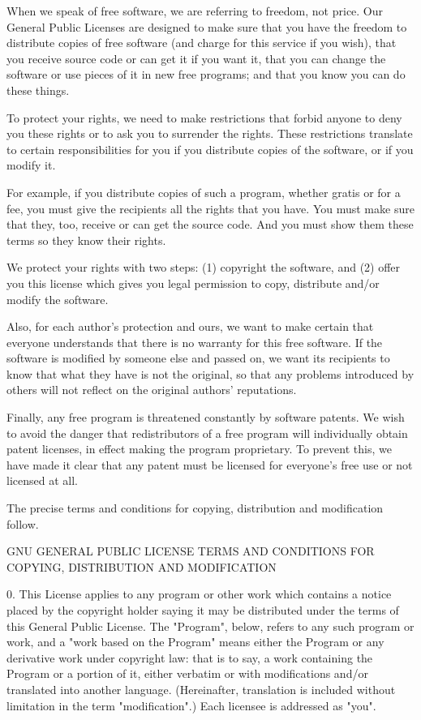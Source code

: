 \documentclass{doc}
\begin{document}
  When we speak of free software, we are referring to freedom, not
price.  Our General Public Licenses are designed to make sure that you
have the freedom to distribute copies of free software (and charge for
this service if you wish), that you receive source code or can get it
if you want it, that you can change the software or use pieces of it
in new free programs; and that you know you can do these things.

  To protect your rights, we need to make restrictions that forbid
anyone to deny you these rights or to ask you to surrender the rights.
These restrictions translate to certain responsibilities for you if you
distribute copies of the software, or if you modify it.

  For example, if you distribute copies of such a program, whether
gratis or for a fee, you must give the recipients all the rights that
you have.  You must make sure that they, too, receive or can get the
source code.  And you must show them these terms so they know their
rights.

  We protect your rights with two steps: (1) copyright the software, and
(2) offer you this license which gives you legal permission to copy,
distribute and/or modify the software.

  Also, for each author's protection and ours, we want to make certain
that everyone understands that there is no warranty for this free
software.  If the software is modified by someone else and passed on, we
want its recipients to know that what they have is not the original, so
that any problems introduced by others will not reflect on the original
authors' reputations.

  Finally, any free program is threatened constantly by software
patents.  We wish to avoid the danger that redistributors of a free
program will individually obtain patent licenses, in effect making the
program proprietary.  To prevent this, we have made it clear that any
patent must be licensed for everyone's free use or not licensed at all.

  The precise terms and conditions for copying, distribution and
modification follow.

		    GNU GENERAL PUBLIC LICENSE
   TERMS AND CONDITIONS FOR COPYING, DISTRIBUTION AND MODIFICATION

  0. This License applies to any program or other work which contains
a notice placed by the copyright holder saying it may be distributed
under the terms of this General Public License.  The "Program", below,
refers to any such program or work, and a "work based on the Program"
means either the Program or any derivative work under copyright law:
that is to say, a work containing the Program or a portion of it,
either verbatim or with modifications and/or translated into another
language.  (Hereinafter, translation is included without limitation in
the term "modification".)  Each licensee is addressed as "you".
\end{document}
